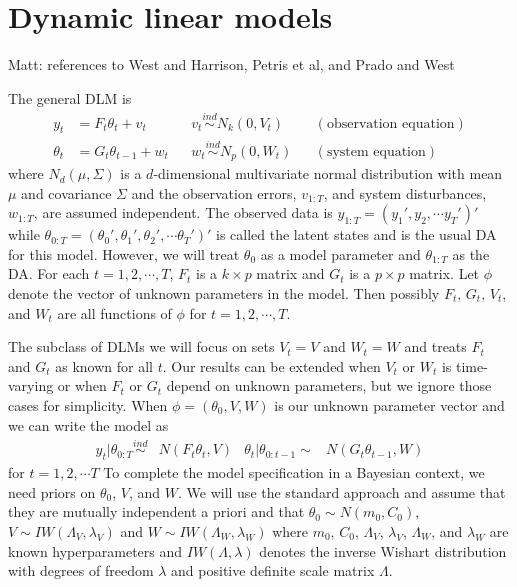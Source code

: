 \documentclass{article}
\newcommand{\matt}[1]{{\color{red} Matt: #1}}
\begin{document}
\section{Dynamic linear models} \label{sec:DLMs} \matt{references to West and Harrison, Petris et al, and Prado and West}

The general DLM is
\begin{align}
y_t &= F_t\theta_t + v_t && v_t \stackrel{ind}{\sim} N_k(0,V_t) && (\mbox{observation equation}) \label{dlmtdobseq}\\
 \theta_t &= G_t\theta_{t-1} + w_t && w_t \stackrel{ind}{\sim} N_p(0,W_t) && (\mbox{system equation}) \label{dlmtdsyseq}
\end{align}
where $N_d(\mu,\Sigma)$ is a $d$-dimensional multivariate normal distribution with mean $\mu$ and covariance $\Sigma$ and the observation errors, $v_{1:T}$, and system disturbances, $w_{1:T}$, are assumed independent. The observed data is $y_{1:T} = (y_1',y_2,\cdots y_T')'$ while $\theta_{0:T}=(\theta_0',\theta_1',\theta_2',\cdots \theta_T')'$ is called the latent states and is the usual DA for this model. However, we will treat $\theta_0$ as a model parameter and $\theta_{1:T}$ as the DA. For each $t=1,2,\cdots,T$, $F_t$ is a $k\times p$ matrix and $G_t$ is a $p\times p$ matrix. Let $\phi$ denote the vector of unknown parameters in the model. Then possibly $F_{t}$, $G_{t}$, $V_{t}$, and $W_{t}$ are all functions of $\phi$ for $t=1,2,\cdots,T$. 

The subclass of DLMs we will focus on sets $V_t=V$ and $W_t=W$ and treats $F_{t}$ and $G_{t}$ as known for all $t$. Our results can be extended when $V_t$ or $W_t$ is time-varying or when $F_t$ or $G_t$ depend on unknown parameters, but we ignore those cases for simplicity. When $\phi=(\theta_0,V,W)$ is our unknown parameter vector and we can write the model as
\begin{align}
  y_t|\theta_{0:T} \stackrel{ind}{\sim} & N(F_t\theta_t,V) &
  \theta_t|\theta_{0:t-1}  \sim & N(G_t\theta_{t-1},W) \label{dlmbotheqs}
\end{align}
for $t=1,2,\cdots T$ To complete the model specification in a Bayesian context, we need priors on $\theta_0$, $V$, and $W$. We will use the standard approach and assume that they are mutually independent a priori and that $\theta_0 \sim N(m_0, C_0)$, $V \sim IW(\Lambda_V, \lambda_V)$ and $W \sim IW(\Lambda_W, \lambda_W)$ where $m_0$, $C_0$, $\Lambda_V$, $\lambda_V$, $\Lambda_W$, and $\lambda_W$ are known hyperparameters and $IW(\Lambda, \lambda)$ denotes the inverse Wishart distribution with degrees of freedom $\lambda$ and positive definite scale matrix $\Lambda$.
\end{document}
